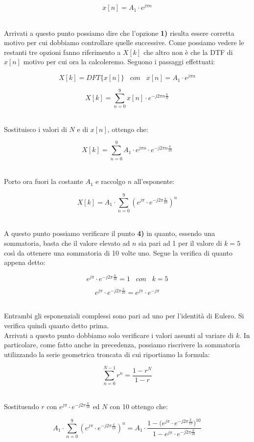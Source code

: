 \documentclass[../main.tex]{subfiles}
\begin{document}
\[ x[n] = A_1  \cdot e^{j\pi n}\]\

Arrivati a questo punto possiamo dire che l'opzione \textbf{1)} risulta essere corretta motivo per cui dobbiamo controllare quelle successive.
Come possiamo vedere le restanti tre opzioni fanno riferimento a $X[k]$ che altro non è che la DTF di $x[n]$ motivo per cui ora la calcoleremo.
Seguono i passaggi effettuati:

\[X[k] = \unit{DFT}\{x[n]\} \hspace{10pt} \unit{con} \hspace{10pt} x[n] = A_1  \cdot e^{j\pi n} \]

\[X[k] = \sum_{n=0}^9 x[n] \cdot e^{-j2\pi n \frac{k}{N}}\]\

Sostituisco i valori di $N$ e di $x[n]$, ottengo che:

\[X[k] = \sum_{n=0}^9 A_1  \cdot e^{j\pi n} \cdot e^{-j2\pi n \frac{k}{10}}\]\

Porto ora fuori la costante $A_1$ e raccolgo $n$ all'esponente:


\[X[k] = A_1 \cdot \sum_{n=0}^9 ( e^{j\pi} \cdot e^{-j2\pi \frac{k}{10}})^n\]\

A questo punto possiamo verificare il punto \textbf{4)} in quanto, essendo una sommatoria, basta che il valore elevato ad $n$ sia pari ad 1 per il valore di $k = 5$ così da ottenere una sommatoria di 10 volte uno.
Segue la verifica di quanto appena detto:

\[ e^{j\pi} \cdot e^{-j2\pi \frac{k}{10}} = 1 \hspace{10pt} \unit{con} \hspace{10pt} k = 5\]

\[ e^{j\pi} \cdot e^{-j2\pi \frac{5}{10}} = e^{j\pi} \cdot e^{-j\pi}  \]\

Entrambi gli esponenziali complessi sono pari ad uno per l'identità di Eulero. Si verifica quindi quanto detto prima.\\


Arrivati a questo punto dobbiamo solo verificare i valori assunti al variare di $k$.
In particolare, come fatto anche in precedenza, possiamo riscrivere la sommatoria utilizzando la serie geometrica troncata di cui riportiamo la formula:

\[ \sum_{n = 0}^{N-1} r^n = \frac{1 - r^N}{1 - r}\]\

Sostituendo $r$ con $e^{j\pi} \cdot e^{-j2\pi \frac{k}{10}}$ ed $N$ con 10 ottengo che:

\[ A_1 \cdot \sum_{n = 0}^{9} ( e^{j\pi} \cdot e^{-j2\pi \frac{k}{10}})^n =A_1 \cdot  \frac{1 - \big(e^{j\pi} \cdot e^{-j2\pi \frac{k}{10}}\big)^{10}}{1 - e^{j\pi} \cdot e^{-j2\pi \frac{k}{10}}}\]\
\end{document}
